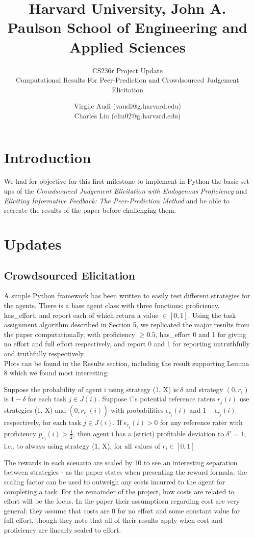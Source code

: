 \documentclass{scrartcl}
\title{Harvard University, John A. Paulson School of Engineering and Applied Sciences \newline}
\subtitle{CS236r Project Update\\ Computational Results For Peer-Prediction and Crowdsourced Judgement Elicitation}
\author{Virgile Audi (vaudi@g.harvard.edu)\\
		Charles Liu (cliu02@g.harvard.edu)}
\begin{document}
 
\maketitle
\section*{Introduction}

We had for objective for this first milestone to implement in Python the basic set ups of the \emph{Crowdsourced Judgement Elicitation with Endogenous Proficiency} and \emph{Eliciting Informative Feedback: The Peer-Prediction Method} and be able to recreate the results of the paper before challenging them.

\section{Updates}
\subsection{Crowdsourced Elicitation}
A simple Python framework has been written to easily test different strategies for the agents. There is a base agent class with three functions: proficiency, has\_effort, and report each of which return a value $\in [0,1]$. Using the task assignment algorithm described in Section 5, we replicated the major results from the paper computationally, with proficiency $\geq 0.5$, has\_effort 0 and 1 for giving no effort and full effort respectively, and report 0 and 1 for reporting untruthfully and truthfully respectively.\\

Plots can be found in the Results section, including the result supporting Lemma 8 which we found most interesting: 
\begin{displayquote}
Suppose the probability of agent i using strategy (1, X) is $\delta$ and strategy $(0, r_i)$ is $1-\delta$ for each task $j \in J(i)$. Suppose i'’s potential reference raters $r_j (i)$ use strategies (1, X) and $(0, r_{r_j} (i))$ with probabilities $\epsilon_{r_j}(i)$ and $1-\epsilon_{r_j}(i)$ respectively, for each task $j \in J(i)$. If $\epsilon_{r_j}(i) > 0$ for any reference rater with proficiency $p_{r_j} (i) > \frac{1}{2}$, then agent i has a (strict) profitable deviation to $\delta'=1$, i.e., to always using strategy (1, X), for all values of $r_i \in [0,1]$
\end{displayquote}

The rewards in each scenario are scaled by 10 to see an interesting separation between strategies - as the paper states when presenting the reward formula, the scaling factor can be used to outweigh any costs incurred to the agent for completing a task. For the remainder of the project, how costs are related to effort will be the focus. In the paper their assumptiosn regarding cost are very general: they assume that costs are 0 for no effort and some constant value for full effort, though they note that all of their results apply when cost and proficiency are linearly scaled to effort. \\
\end{document}
